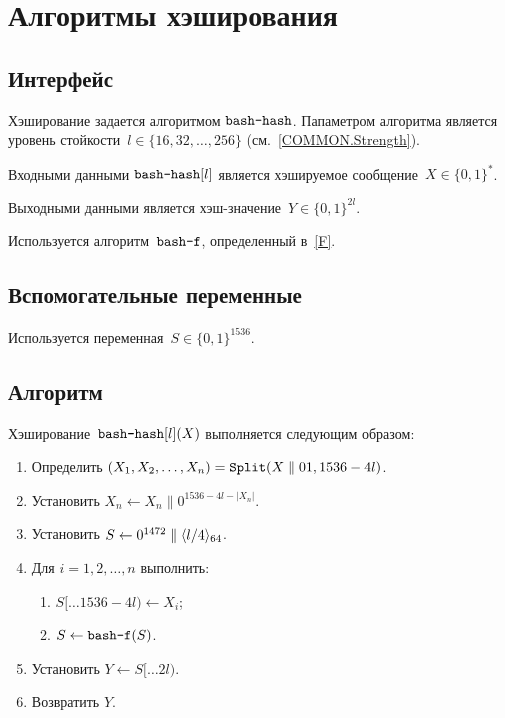 \chapter{Алгоритмы хэширования}\label{HASH}

\section{Интерфейс}\label{HASH.IFace}

Хэширование задается алгоритмом $\texttt{bash-hash}$.
Папаметром алгоритма является уровень стойкости~$l\in\{16,32,\ldots,256\}$ 
(см.~\ref{COMMON.Strength}).

Входными данными $\texttt{bash-hash}[l]$ является хэшируемое 
сообщение~$X\in\{0,1\}^*$.

Выходными данными является хэш-значение~$Y\in\{0,1\}^{2l}$.

Используется алгоритм~$\texttt{bash-f}$, определенный в~\ref{F}.

\section{Вспомогательные переменные}\label{HASH.Vars}

Используется переменная~$S\in\{0,1\}^{1536}$.

\section{Алгоритм}\label{HASH.Alg}

Хэширование~$\texttt{bash-hash}[l](X)$ выполняется следующим образом:
\begin{enumerate}
\item
Определить
$(X_1,X_2,\ldots,X_n)=\mathop{\texttt{Split}}\nolimits(X\parallel 01, 1536-4l)$.

\item
Установить 
$X_n\leftarrow X_n \parallel 0^{1536-4l-|X_n|}$.

\item
Установить
$S\leftarrow 0^{1472}\parallel\langle l/4\rangle_{64}$.

\item
Для $i=1,2,\ldots,n$ выполнить:
\begin{enumerate}
\item
$S[\dots 1536-4l)\leftarrow X_i$;
\item
$S\leftarrow\texttt{bash-f}(S)$.
\end{enumerate}

\item
Установить
$Y\leftarrow S[\dots 2l)$.

\item
Возвратить $Y$.
\end{enumerate}
